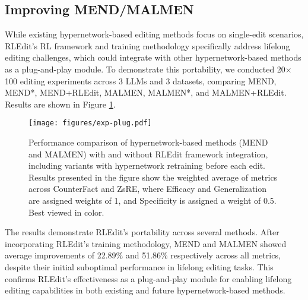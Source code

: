 \subsection{Improving MEND/MALMEN}
\label{sec:4.6}
While existing hypernetwork-based editing methods focus on single-edit scenarios, RLEdit's RL framework and training methodology specifically address lifelong editing challenges, which could integrate with other hypernetwork-based methods as a plug-and-play module. To demonstrate this portability, we conducted 20$\times$100 editing experiments across 3 LLMs and 3 datasets, comparing MEND, MEND*, MEND+RLEdit, MALMEN, MALMEN*, and MALMEN+RLEdit. Results are shown in Figure \ref{fig:plug}.

\begin{figure}
    \centering
    \texttt{[image: figures/exp-plug.pdf]}
    \caption{Performance comparison of hypernetwork-based methods (MEND and MALMEN) with and without RLEdit framework integration, including variants with hypernetwork retraining before each edit. Results presented in the figure show the weighted average of metrics across CounterFact and ZsRE, where Efficacy and Generalization are assigned weights of 1, and Specificity is assigned a weight of 0.5. Best viewed in color.}
    \label{fig:plug}
\end{figure}

The results demonstrate RLEdit's portability across several methods. After incorporating RLEdit's training methodology, MEND and MALMEN showed average improvements of 22.89\% and 51.86\% respectively across all metrics, despite their initial suboptimal performance in lifelong editing tasks. This confirms RLEdit's effectiveness as a plug-and-play module for enabling lifelong editing capabilities in both existing and future hypernetwork-based methods.
